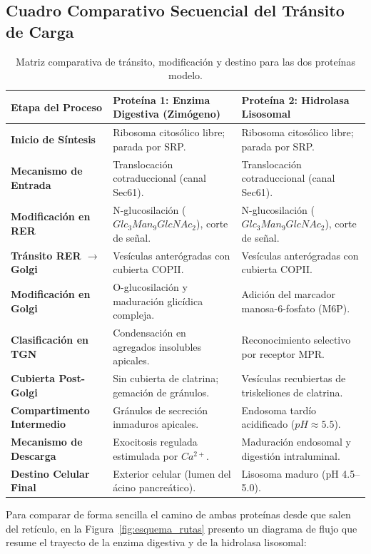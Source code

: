 \documentclass[spanish,letterpaper,oneside]{article}
\begin{document}
\subsection{Cuadro Comparativo Secuencial del Tránsito de Carga}

\begin{table}[htbp]
\centering
\footnotesize
\begin{tabularx}{\textwidth}{p{3.2cm}ZZ}
\toprule
\textbf{Etapa del Proceso} & \textbf{Proteína 1: Enzima Digestiva (Zimógeno)} & \textbf{Proteína 2: Hidrolasa Lisosomal} \\
\midrule
\textbf{Inicio de Síntesis} & Ribosoma citosólico libre; parada por SRP. & Ribosoma citosólico libre; parada por SRP. \\
\textbf{Mecanismo de Entrada} & Translocación cotraduccional (canal Sec61). & Translocación cotraduccional (canal Sec61). \\
\textbf{Modificación en RER} & N-glucosilación ($Glc_3Man_9GlcNAc_2$), corte de señal. & N-glucosilación ($Glc_3Man_9GlcNAc_2$), corte de señal. \\
\textbf{Tránsito RER $\to$ Golgi} & Vesículas anterógradas con cubierta COPII. & Vesículas anterógradas con cubierta COPII. \\
\textbf{Modificación en Golgi} & O-glucosilación y maduración glicídica compleja. & Adición del marcador manosa-6-fosfato (M6P). \\
\textbf{Clasificación en TGN} & Condensación en agregados insolubles apicales. & Reconocimiento selectivo por receptor MPR. \\
\textbf{Cubierta Post-Golgi} & Sin cubierta de clatrina; gemación de gránulos. & Vesículas recubiertas de triskeliones de clatrina. \\
\textbf{Compartimento Intermedio} & Gránulos de secreción inmaduros apicales. & Endosoma tardío acidificado ($pH \approx 5.5$). \\
\textbf{Mecanismo de Descarga} & Exocitosis regulada estimulada por $Ca^{2+}$. & Maduración endosomal y digestión intraluminal. \\
\textbf{Destino Celular Final} & Exterior celular (lumen del ácino pancreático). & Lisosoma maduro (pH 4.5--5.0). \\
\bottomrule
\end{tabularx}
\caption{Matriz comparativa de tránsito, modificación y destino para las dos proteínas modelo.}
\label{tab:comparativo_rutas}
\end{table}

Para comparar de forma sencilla el camino de ambas proteínas desde que salen del retículo, en la Figura~\ref{fig:esquema_rutas} presento un diagrama de flujo que resume el trayecto de la enzima digestiva y de la hidrolasa lisosomal:
\end{document}
